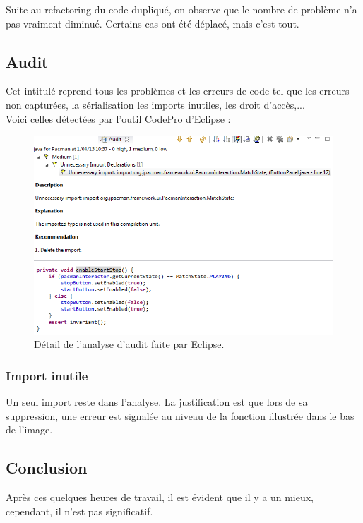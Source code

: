 \documentclass[12pt,a4paper,final]{article}
\begin{document}
Suite au refactoring du code dupliqué, on observe que le nombre de problème n'a pas vraiment diminué. Certains cas ont été déplacé, mais c'est tout.

\clearpage
\subsection{Audit}
Cet intitulé reprend tous les problèmes et les erreurs de code tel que les erreurs non capturées, la sérialisation les imports inutiles, les droit d'accès,...\\
Voici celles détectées par l'outil CodePro d'Eclipse : 
\begin{figure}[!h]
	\centering
	\includegraphics[width=\textwidth]{Audit_refactor.png}
	\caption{\label{Audit_refact}Détail de l'analyse d'audit faite par Eclipse.}
\end{figure}

\subsubsection{Import inutile}
Un seul import reste dans l'analyse. La justification est que lors de sa suppression, une erreur est signalée au niveau de la fonction illustrée dans le bas de l'image.

\subsection{Conclusion}
Après ces quelques heures de travail, il est évident que il y a un mieux, cependant, il n'est pas significatif.
\end{document}
